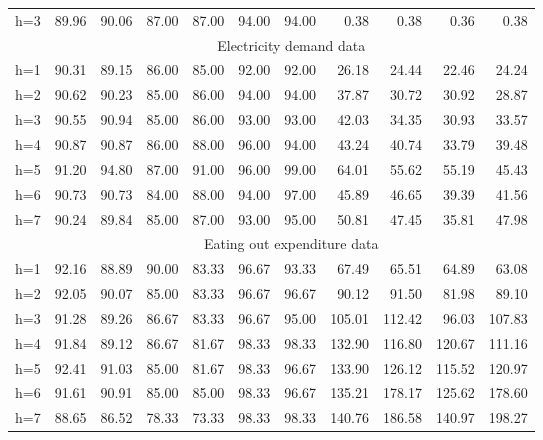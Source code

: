 \documentclass[
  american,
  12pt]{article}
\theoremstyle{plain}
\theoremstyle{plain}
\theoremstyle{remark}
\begin{document}
\begin{table}
{{\begin{tabular}{lrrrrrrrrrr}
h=3  & 89.96 & 90.06 & 87.00 & 87.00 & 94.00 & 94.00 & 0.38 & 0.38 & 0.36 & 0.38 \\
\cmidrule(l{3pt}r{3pt}){2-11}
     & \multicolumn{10}{c}{Electricity demand data}                                                                                                                                                                                                                                     \\[0.3em]
h=1  & 90.31 & 89.15 & 86.00 & 85.00 & 92.00 & 92.00 & 26.18 & 24.44 & 22.46 & 24.24 \\
h=2  & 90.62 & 90.23 & 85.00 & 86.00 & 94.00 & 94.00 & 37.87 & 30.72 & 30.92 & 28.87 \\
h=3  & 90.55 & 90.94 & 85.00 & 86.00 & 93.00 & 93.00 & 42.03 & 34.35 & 30.93 & 33.57 \\
h=4  & 90.87 & 90.87 & 86.00 & 88.00 & 96.00 & 94.00 & 43.24 & 40.74 & 33.79 & 39.48 \\
h=5  & 91.20 & 94.80 & 87.00 & 91.00 & 96.00 & 99.00 & 64.01 & 55.62 & 55.19 & 45.43 \\
h=6  & 90.73 & 90.73 & 84.00 & 88.00 & 94.00 & 97.00 & 45.89 & 46.65 & 39.39 & 41.56 \\
h=7  & 90.24 & 89.84 & 85.00 & 87.00 & 93.00 & 95.00 & 50.81 & 47.45 & 35.81 & 47.98 \\
\cmidrule(l{3pt}r{3pt}){2-11}
     & \multicolumn{10}{c}{Eating out expenditure data}                                                                                                                                                                                                                                 \\[0.3em]
h=1  & 92.16 & 88.89 & 90.00 & 83.33 & 96.67 & 93.33 & 67.49 & 65.51 & 64.89 & 63.08 \\
h=2  & 92.05 & 90.07 & 85.00 & 83.33 & 96.67 & 96.67 & 90.12 & 91.50 & 81.98 & 89.10 \\
h=3  & 91.28 & 89.26 & 86.67 & 83.33 & 96.67 & 95.00 & 105.01 & 112.42 & 96.03 & 107.83 \\
h=4  & 91.84 & 89.12 & 86.67 & 81.67 & 98.33 & 98.33 & 132.90 & 116.80 & 120.67 & 111.16 \\
h=5  & 92.41 & 91.03 & 85.00 & 81.67 & 98.33 & 96.67 & 133.90 & 126.12 & 115.52 & 120.97 \\
h=6  & 91.61 & 90.91 & 85.00 & 85.00 & 98.33 & 96.67 & 135.21 & 178.17 & 125.62 & 178.60 \\
h=7  & 88.65 & 86.52 & 78.33 & 73.33 & 98.33 & 98.33 & 140.76 & 186.58 & 140.97 & 198.27 \\

\end{tabular}}}
\end{table}
\end{document}
